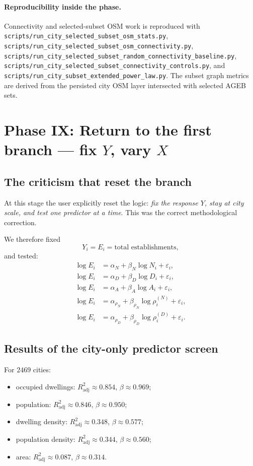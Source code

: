 \documentclass[11pt]{article}
\newcommand{\adjR}{R^2_{\mathrm{adj}}}
\begin{document}
\paragraph{Reproducibility inside the phase.}
Connectivity and selected-subset OSM work is reproduced with
\texttt{scripts/run\_city\_selected\_subset\_osm\_stats.py},
\texttt{scripts/run\_city\_selected\_subset\_osm\_connectivity.py},
\texttt{scripts/run\_city\_selected\_subset\_random\_connectivity\_baseline.py},
\texttt{scripts/run\_city\_selected\_subset\_connectivity\_controls.py},
and
\texttt{scripts/run\_city\_subset\_extended\_power\_law.py}.
The subset graph metrics are derived from the persisted city OSM layer intersected with selected AGEB sets.

\section{Phase IX: Return to the first branch --- fix \(Y\), vary \(X\)}

\subsection{The criticism that reset the branch}

At this stage the user explicitly reset the logic: \emph{fix the response \(Y\), stay at city scale, and test one predictor at a time}. This was the correct methodological correction.

We therefore fixed
\begin{equation}
Y_i = E_i = \text{total establishments},
\end{equation}
and tested:
\begin{align}
\log E_i &= \alpha_N + \beta_N \log N_i + \varepsilon_i,\\
\log E_i &= \alpha_D + \beta_D \log D_i + \varepsilon_i,\\
\log E_i &= \alpha_A + \beta_A \log A_i + \varepsilon_i,\\
\log E_i &= \alpha_{\rho_N} + \beta_{\rho_N} \log \rho_i^{(N)} + \varepsilon_i,\\
\log E_i &= \alpha_{\rho_D} + \beta_{\rho_D} \log \rho_i^{(D)} + \varepsilon_i.
\end{align}

\subsection{Results of the city-only predictor screen}

For \(2469\) cities:
\begin{itemize}
\item occupied dwellings: \(\adjR \approx 0.854\), \(\beta \approx 0.969\);
\item population: \(\adjR \approx 0.846\), \(\beta \approx 0.950\);
\item dwelling density: \(\adjR \approx 0.348\), \(\beta \approx 0.577\);
\item population density: \(\adjR \approx 0.344\), \(\beta \approx 0.560\);
\item area: \(\adjR \approx 0.087\), \(\beta \approx 0.314\).
\end{itemize}
\end{document}
